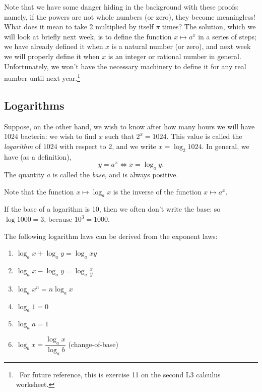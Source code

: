 Note that we have some danger hiding in the background with these proofs: namely, if the powers are not whole numbers (or zero), they become
meaningless! What does it mean to take 2 multiplied by itself $ \pi $ times? The solution, which we will look at briefly next week, is to define
the function $ x \mapsto a^x $ in a series of steps; we have already defined it when $ x $ is a natural number (or zero), and next week we will
properly define it when $ x $ is an integer or rational number in general. Unfortunately, we won't have the necessary machinery to define it for
any real number until next year.\footnote{~For future reference, this is exercise 11 on the second L3 calculus worksheet.}

\subsection*{Logarithms}
Suppose, on the other hand, we wish to know after how many hours we will have 1024 bacteria: we wish to find $ x $ such
that $ 2^x = 1024 $. This value is called the \emph{logarithm} of $ 1024 $ with respect to 2, and we write $ x = \log_2 1024 $.
In general, we have (as a definition),
\begin{displaymath}
  y = a^x \iff x = \log_a y.
\end{displaymath}
The quantity $ a $ is called the \emph{base}, and is always positive.

Note that the function $ x \mapsto \log_a x $ is the inverse of the function $ x \mapsto a^x $.

\begin{center}
\end{center}

If the base of a logarithm is 10, then we often don't write the base: so $ \log 1000 = 3 $, because $ 10^3 = 1000 $.

The following logarithm laws can be derived from the exponent laws:
\begin{enumerate}
    \item $ \log_a x + \log_a y = \log_a xy $
    \item $ \log_a x - \log_a y = \log_a \frac{x}{y} $
    \item $ \log_a x^n = n \log_a x $
    \item $ \log_a 1 = 0 $
    \item $ \log_a a = 1 $
    \item $ \log_b x = \dfrac{\log_a x}{\log_a b} $ (change-of-base)
\end{enumerate}

